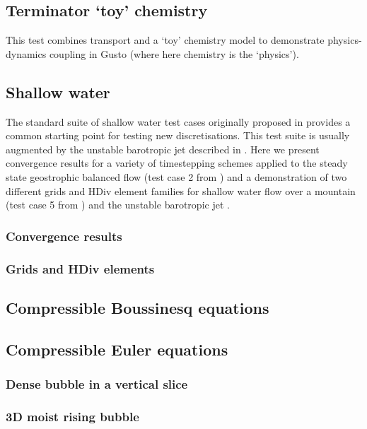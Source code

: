 \documentclass[journal abbreviation, manuscript]{copernicus}
\begin{document}
\subsection{Terminator `toy' chemistry}
This test combines transport and a `toy' chemistry model to
demonstrate physics-dynamics coupling in Gusto (where here chemistry
is the `physics').

\subsection{Shallow water}
The standard suite of shallow water test cases originally proposed in
\citet{williamson1992standard} provides a common starting point for
testing new discretisations. This test suite is usually augmented by
the unstable barotropic jet described in
\citet{galewsky2004initial}. Here we present convergence results for a
variety of timestepping schemes applied to the steady state
geostrophic balanced flow (test case 2 from
\citet{williamson1992standard}) and a demonstration of two different
grids and HDiv element families for shallow water flow over a mountain
(test case 5 from \citet{williamson1992standard}) and the unstable
barotropic jet \citep{galewsky2004initial}.

\subsubsection{Convergence results}



\subsubsection{Grids and HDiv elements}

\subsection{Compressible Boussinesq equations}

\subsection{Compressible Euler equations}

\subsubsection{Dense bubble in a vertical slice}

\subsubsection{3D moist rising bubble}
\end{document}
